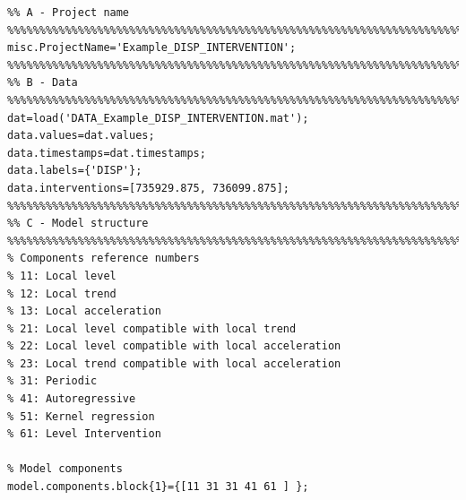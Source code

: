 \begin{lstlisting}[linewidth=\linewidth, style=Matlab-editor,  basicstyle = \mlttfamily \tiny, backgroundcolor = \color{matlab-yellow}, caption = {Configuration file for the example \#5}, label=LST:CFGFileExampleInt, captionpos=b, float=h!]
%%%%%%%%%%%%%%%%%%%%%%%%%%%%%%%%%%%%%%%%%%%%%%%%%%%%%%%%%%%%%%%%%%%%%%%%%%%
%% A - Project name
%%%%%%%%%%%%%%%%%%%%%%%%%%%%%%%%%%%%%%%%%%%%%%%%%%%%%%%%%%%%%%%%%%%%%%%%%%%
misc.ProjectName='Example_DISP_INTERVENTION';
%%%%%%%%%%%%%%%%%%%%%%%%%%%%%%%%%%%%%%%%%%%%%%%%%%%%%%%%%%%%%%%%%%%%%%%%%%%
%% B - Data
%%%%%%%%%%%%%%%%%%%%%%%%%%%%%%%%%%%%%%%%%%%%%%%%%%%%%%%%%%%%%%%%%%%%%%%%%%%
dat=load('DATA_Example_DISP_INTERVENTION.mat'); 
data.values=dat.values;
data.timestamps=dat.timestamps;
data.labels={'DISP'};
data.interventions=[735929.875, 736099.875];
%%%%%%%%%%%%%%%%%%%%%%%%%%%%%%%%%%%%%%%%%%%%%%%%%%%%%%%%%%%%%%%%%%%%%%%%%%%
%% C - Model structure 
%%%%%%%%%%%%%%%%%%%%%%%%%%%%%%%%%%%%%%%%%%%%%%%%%%%%%%%%%%%%%%%%%%%%%%%%%%%
% Components reference numbers
% 11: Local level
% 12: Local trend
% 13: Local acceleration
% 21: Local level compatible with local trend
% 22: Local level compatible with local acceleration
% 23: Local trend compatible with local acceleration
% 31: Periodic
% 41: Autoregressive
% 51: Kernel regression
% 61: Level Intervention

% Model components
model.components.block{1}={[11 31 31 41 61 ] };
 

\end{lstlisting}
